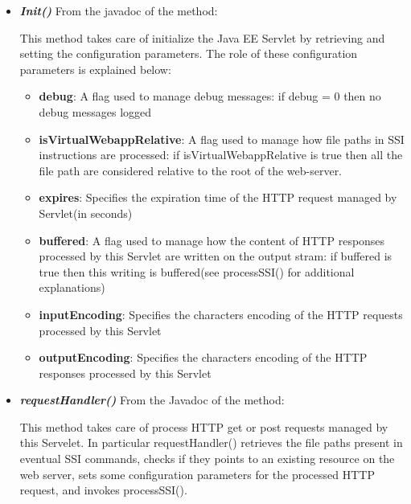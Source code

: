 \documentclass[11pt,titlepage]{article} %
\begin{document}
  \begin{itemize}
    \item \textbf{\textit{Init()}}
      \newline From the javadoc of the method:
      
      This method takes care of initialize the Java EE Servlet by retrieving and setting the configuration
      parameters.\newline
      The role of these configuration parameters is explained below:
      \begin{itemize}
       \item \textbf{debug}:
	A flag used to manage debug messages: if debug = 0 then no debug messages logged
       \item \textbf{isVirtualWebappRelative}:
	A flag used to manage how file paths in SSI instructions are processed: if isVirtualWebappRelative is true then all the file path are
	considered relative to the root of the web-server.
       \item \textbf{expires}:
	Specifies the expiration time of the HTTP request managed by Servlet(in seconds)
       \item \textbf{buffered}:
	A flag used to manage how the content of HTTP responses processed by this Servlet are written on the output stram:
	if buffered is true then this writing is buffered(see processSSI() for additional explanations)
       \item \textbf{inputEncoding}:
	Specifies the characters encoding of the HTTP requests processed by this Servlet
       \item \textbf{outputEncoding}:
	Specifies the characters encoding of the HTTP responses processed by this Servlet
      \end{itemize}

      

    \item \textbf{\textit{requestHandler()}}
      \newline From the Javadoc of the method:
      
      
      
      This method takes care of process HTTP get or post requests managed by this Servelet. In particular 
      requestHandler() retrieves the file paths present in eventual SSI commands, checks if they points to an
      existing resource on the web server, sets some configuration parameters for the processed HTTP request, and 
      invokes processSSI().\newline
      

\end{itemize}
\end{document}
